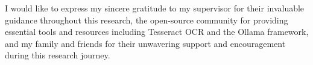 
I would like to express my sincere gratitude to my supervisor for their invaluable guidance throughout this research, the open-source community for providing essential tools and resources including Tesseract OCR and the Ollama framework, and my family and friends for their unwavering support and encouragement during this research journey.